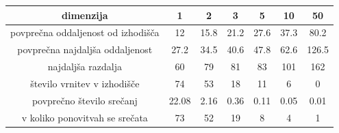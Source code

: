 \documentclass[a4paper,oneside,12pt]{article}
\begin{document}
\begin{center}
\begin{tabular}{|c| c c c c c c|} 
\hline
dimenzija & 1 & 2 & 3 & 5 & 10 & 50 \\ [0.5ex] 
\hline \hline 
povprečna oddaljenost od izhodišča & 12 & 15.8 & 21.2 & 27.6 & 37.3 & 80.2 \\ [0.5ex] 
\hline
povprečna najdaljša oddaljenost & 27.2 & 34.5 & 40.6 & 47.8 & 62.6 & 126.5  \\ [0.5ex] 
\hline
najdaljša razdalja & 60 & 79 & 81 & 83 & 101 & 162 \\ [0.5ex] 
\hline
število vrnitev v izhodišče & 74 & 53 & 18 & 11 & 6 & 0 \\ [0.5ex] 
\hline
povprečno število srečanj & 22.08 & 2.16 & 0.36 & 0.11 & 0.05 & 0.01 \\ [0.5ex] 
\hline
v koliko ponovitvah se srečata & 73 & 52 & 19 & 8 & 4 & 1 \\ [0.5ex] 
\hline
\end{tabular}
\end{center}
\end{document}
